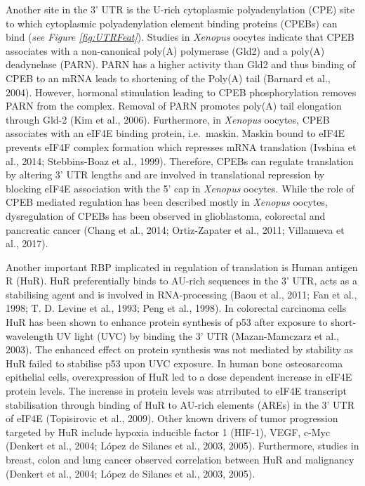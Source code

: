 \documentclass[
  12pt,
  openany]{book}
\begin{document}
Another site in the 3' UTR is the U-rich cytoplasmic polyadenylation (CPE) site to which cytoplasmic polyadenylation element binding proteins (CPEBs) can bind (\emph{see Figure \ref{fig:UTRFeat}}). Studies in \emph{Xenopus} oocytes indicate that CPEB associates with a non-canonical poly(A) polymerase (Gld2) and a poly(A) deadynelase (PARN). PARN has a higher activity than Gld2 and thus binding of CPEB to an mRNA leads to shortening of the Poly(A) tail (Barnard et al., 2004). However, hormonal stimulation leading to CPEB phosphorylation removes PARN from the complex. Removal of PARN promotes poly(A) tail elongation through Gld-2 (Kim et al., 2006). Furthermore, in \emph{Xenopus} oocytes, CPEB associates with an eIF4E binding protein, i.e.~maskin. Maskin bound to eIF4E prevents eIF4F complex formation which represses mRNA translation (Ivshina et al., 2014; Stebbins-Boaz et al., 1999). Therefore, CPEBs can regulate translation by altering 3' UTR lengths and are involved in translational repression by blocking eIF4E association with the 5' cap in \emph{Xenopus} oocytes. While the role of CPEB mediated regulation has been described mostly in \emph{Xenopus} oocytes, dysregulation of CPEBs has been observed in glioblastoma, colorectal and pancreatic cancer (Chang et al., 2014; Ortiz-Zapater et al., 2011; Villanueva et al., 2017).

Another important RBP implicated in regulation of translation is Human antigen R (HuR). HuR preferentially binds to AU-rich sequences in the 3' UTR, acts as a stabilising agent and is involved in RNA-processing (Baou et al., 2011; Fan et al., 1998; T. D. Levine et al., 1993; Peng et al., 1998). In colorectal carcinoma cells HuR has been shown to enhance protein synthesis of p53 after exposure to short-wavelength UV light (UVC) by binding the 3' UTR (Mazan-Mamczarz et al., 2003). The enhanced effect on protein synthesis was not mediated by stability as HuR failed to stabilise p53 upon UVC exposure. In human bone osteosarcoma epithelial cells, overexpression of HuR led to a dose dependent increase in eIF4E protein levels. The increase in protein levels was atrributed to eIF4E transcript stabilisation through binding of HuR to AU-rich elements (AREs) in the 3' UTR of eIF4E (Topisirovic et al., 2009). Other known drivers of tumor progression targeted by HuR include hypoxia inducible factor 1 (HIF-1), VEGF, c-Myc (Denkert et al., 2004; López de Silanes et al., 2003, 2005). Furthermore, studies in breast, colon and lung cancer observed correlation between HuR and malignancy (Denkert et al., 2004; López de Silanes et al., 2003, 2005).
\end{document}
